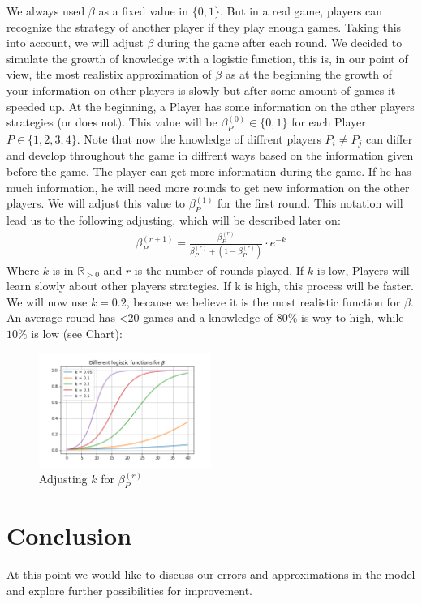 We always used $\beta$ as a fixed value in $\{0,1\}$. But in a real game, players can recognize the strategy of another player if they play enough games. Taking this into account, we will adjust $\beta$ during the game after each round. We decided to simulate the growth of knowledge with a logistic function, this is, in our point of view, the most realistix approximation of $\beta$ as at the beginning the growth of your information on other players is slowly but after some amount of games it speeded up. At the beginning, a Player has some information on the other players strategies (or does not). This value will be $\beta^{(0)}_{P}\in\{0,1\}$ for each Player $P\in\{1,2,3,4\}$. Note that now the knowledge of diffrent players $P_i\neq P_j$ can differ and develop throughout the game in diffrent ways based on the information given before the game. The player can get more information during the game. If he has much information, he will need more rounds to get new information on the other players. We will adjust this value to $\beta^{(1)}_{P}$ for the first round. This notation will lead us to the following adjusting, which will be described later on:
\begin{align*}
\beta^{(r+1)}_{P} = \frac{\beta^{(r)}_{P}
}{\beta^{(r)}_{P} + (1 - \beta^{(r)}_{P})} \cdot e^{-k}
\end{align*}
Where $k$ is in $\mathbb{R}_{>0}$ and $r$ is the number of rounds played. If $k$ is low, Players will learn slowly about other players strategies. If k is high, this process will be faster. We will now use $k = 0.2$, because we believe it is the most realistic function for $\beta$. An average round has <20 games and a knowledge of $80\%$ is way to high, while $10\%$ is low (see Chart):

\begin{figure}[h!]
    \centering
    \includegraphics[width=0.5\textwidth]{Bilder/5_log}
    \caption{Adjusting $k$ for $\beta^{(r)}_{P}$}
    \label{fig:meine-grafik}
\end{figure}

\section{Conclusion}
At this point we would like to discuss our errors and approximations in the model and explore further possibilities for improvement.

